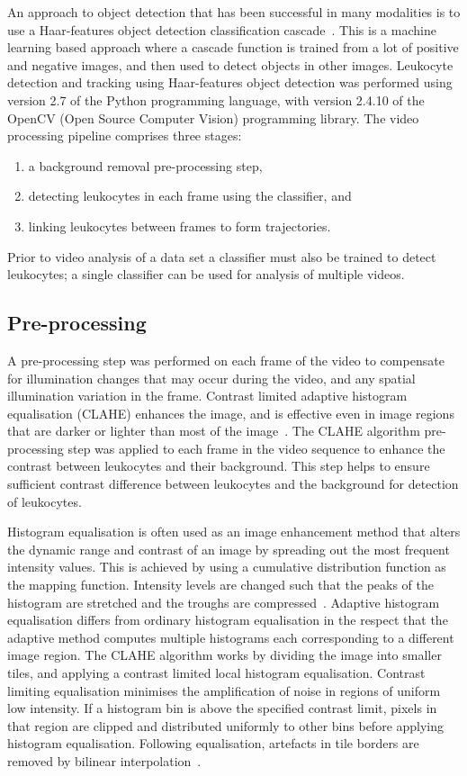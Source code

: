 An approach to object detection that has been successful in many modalities is to use a Haar-features object detection classification cascade~\cite{Lienhart2002}. This is a machine learning based approach where a cascade function is trained from a lot of positive and negative images, and  then used to detect objects in other images. Leukocyte detection and tracking using Haar-features object detection was performed using version 2.7 of the Python programming language, with version 2.4.10 of the OpenCV (Open Source Computer Vision) programming library. The video processing pipeline comprises three stages:
\begin{enumerate}
\item a background removal pre-processing step,
\item detecting leukocytes in each frame using the classifier, and 
\item linking leukocytes between frames to form trajectories.
\end{enumerate}
Prior to video analysis of a data set a classifier must also be trained to detect leukocytes; a single classifier can be used for analysis of multiple videos.

\subsection{Pre-processing}
\label{leukocytes:processing:pre-processing}
A pre-processing step was performed on each frame of the video to compensate for illumination changes that may occur during the video, and any spatial illumination variation in the frame. Contrast limited adaptive histogram equalisation (CLAHE) enhances the image, and is effective even in image regions that are darker or lighter than most of the image~\cite{Ketcham1974}. The CLAHE algorithm pre-processing step was applied to each frame in the video sequence to enhance the contrast between leukocytes and their background. This step helps to ensure sufficient contrast difference between leukocytes and the background for detection of leukocytes.

Histogram equalisation is often used as an image enhancement method that alters the dynamic range and contrast of an image by spreading out the most frequent intensity values. This is achieved by using a cumulative distribution function as the mapping function. Intensity levels are changed such that the peaks of the histogram are stretched and the troughs are compressed~\cite{Sasi2013}. Adaptive histogram equalisation differs from ordinary histogram equalisation in the respect that the adaptive method computes multiple histograms each corresponding to a different image region. The CLAHE algorithm works by dividing the image into smaller tiles, and applying a contrast limited local histogram equalisation. Contrast limiting equalisation minimises the amplification of noise in regions of uniform low intensity. If a histogram bin is above the specified contrast limit, pixels in that region are clipped and distributed uniformly to other bins before applying histogram equalisation. Following equalisation, artefacts in tile borders are removed by bilinear interpolation~\cite{Hummel1977}.

